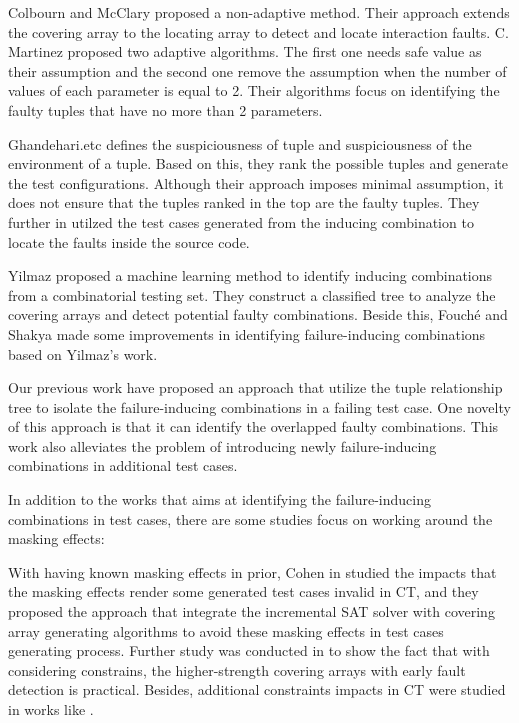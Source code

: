 \documentclass{sig-alternate}
\begin{document}
Colbourn and McClary \cite{colbourn2008locating} proposed a non-adaptive method. Their approach extends the covering array to the locating array to detect and locate interaction faults. C. Martinez \cite{martinez2008algorithms,martinez2009locating} proposed two adaptive algorithms. The first one needs safe value as their assumption and the second one remove the assumption when the number of values of each parameter is equal to 2. Their algorithms focus on identifying the faulty tuples that have no more than 2 parameters.

Ghandehari.etc \cite{ghandehari2012identifying} defines the suspiciousness of tuple and suspiciousness of the environment of a tuple. Based on this, they rank the possible tuples and generate the test configurations. Although their approach imposes minimal assumption, it does not ensure that the tuples ranked in the top are the faulty tuples. They further in \cite{ghandehari2013fault} utilzed the test cases generated from the inducing combination to locate the faults inside the source code.


Yilmaz \cite{yilmaz2006covering} proposed a machine learning method to identify inducing combinations from a combinatorial testing set. They construct a classified tree to analyze the covering arrays and detect potential faulty combinations. Beside this, Fouché \cite{fouche2009incremental} and Shakya \cite{shakya2012isolating} made some improvements in identifying failure-inducing combinations based on Yilmaz's work.

Our previous work \cite{niu2013identifying} have proposed an approach that utilize the tuple relationship tree to isolate the failure-inducing combinations in a failing test case. One novelty of this approach is that it can identify the overlapped faulty combinations. This work also alleviates the problem of introducing newly failure-inducing combinations in additional test cases.

In addition to the works that aims at identifying the failure-inducing combinations in test cases, there are some studies focus on working around the masking effects:

With having known masking effects in prior, Cohen  in\cite{cohen2007exploiting,cohen2007interaction,cohen2008constructing} studied the impacts that the masking effects render some generated test cases invalid in CT, and they proposed the approach that integrate the incremental SAT solver with covering array generating algorithms to avoid these masking effects in test cases generating process. Further study was conducted in \cite{petke2013efficiency}to show the fact that with considering constrains, the higher-strength covering arrays with early fault detection is practical. Besides, additional constraints impacts in CT were studied in works like \cite{garvin2011evaluating,bryce2006prioritized,calvagna2008logic,grindal2006handling,yilmaz2013test}. %
\end{document}
